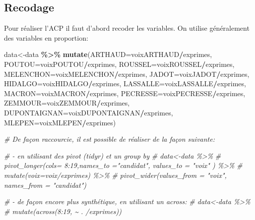 \documentclass[
]{book}
\newenvironment{Shaded}{\begin{snugshade}}{\end{snugshade}}
\newcommand{\AttributeTok}[1]{\textcolor[rgb]{0.13,0.29,0.53}{#1}}
\newcommand{\CommentTok}[1]{\textcolor[rgb]{0.56,0.35,0.01}{\textit{#1}}}
\newcommand{\FunctionTok}[1]{\textcolor[rgb]{0.13,0.29,0.53}{\textbf{#1}}}
\newcommand{\NormalTok}[1]{#1}
\newcommand{\OtherTok}[1]{\textcolor[rgb]{0.56,0.35,0.01}{#1}}
\newcommand{\SpecialCharTok}[1]{\textcolor[rgb]{0.81,0.36,0.00}{\textbf{#1}}}
\begin{document}
\hypertarget{recodage}{%
\subsection{Recodage}\label{recodage}}

Pour réaliser l'ACP il faut d'abord recoder les variables. On utilise généralement des variables en proportion:

\begin{Shaded}
\begin{Highlighting}[]
\NormalTok{data}\OtherTok{\textless{}{-}}\NormalTok{data }\SpecialCharTok{\%\textgreater{}\%}
  \FunctionTok{mutate}\NormalTok{(}\AttributeTok{ARTHAUD=}\NormalTok{voixARTHAUD}\SpecialCharTok{/}\NormalTok{exprimes,}
         \AttributeTok{POUTOU=}\NormalTok{voixPOUTOU}\SpecialCharTok{/}\NormalTok{exprimes,}
         \AttributeTok{ROUSSEL=}\NormalTok{voixROUSSEL}\SpecialCharTok{/}\NormalTok{exprimes,}
         \AttributeTok{MELENCHON=}\NormalTok{voixMELENCHON}\SpecialCharTok{/}\NormalTok{exprimes,}
         \AttributeTok{JADOT=}\NormalTok{voixJADOT}\SpecialCharTok{/}\NormalTok{exprimes,}
         \AttributeTok{HIDALGO=}\NormalTok{voixHIDALGO}\SpecialCharTok{/}\NormalTok{exprimes,}
         \AttributeTok{LASSALLE=}\NormalTok{voixLASSALLE}\SpecialCharTok{/}\NormalTok{exprimes,}
         \AttributeTok{MACRON=}\NormalTok{voixMACRON}\SpecialCharTok{/}\NormalTok{exprimes,}
         \AttributeTok{PECRESSE=}\NormalTok{voixPECRESSE}\SpecialCharTok{/}\NormalTok{exprimes,}
         \AttributeTok{ZEMMOUR=}\NormalTok{voixZEMMOUR}\SpecialCharTok{/}\NormalTok{exprimes,}
         \AttributeTok{DUPONTAIGNAN=}\NormalTok{voixDUPONTAIGNAN}\SpecialCharTok{/}\NormalTok{exprimes,}
         \AttributeTok{MLEPEN=}\NormalTok{voixMLEPEN}\SpecialCharTok{/}\NormalTok{exprimes)}


\CommentTok{\# De façon raccourcie, il est possible de réaliser de la façon suivante:}

\CommentTok{\# {-} en utilisant des pivot (tidyr) et un group by}
\CommentTok{\# data\textless{}{-}data \%\textgreater{}\%}
\CommentTok{\#   pivot\_longer(cols= 8:19,names\_to ="candidat", values\_to = "voix" ) \%\textgreater{}\%}
\CommentTok{\#   mutate(voix=voix/exprimes) \%\textgreater{}\%}
\CommentTok{\#   pivot\_wider(values\_from = "voix", names\_from = "candidat")}

\CommentTok{\# {-} de façon encore plus synthétique, en utilisant un across:}
\CommentTok{\# data\textless{}{-}data \%\textgreater{}\%}
\CommentTok{\#  mutate(across(8:19, \textasciitilde{} . /exprimes))}
\end{Highlighting}
\end{Shaded}
\end{document}
